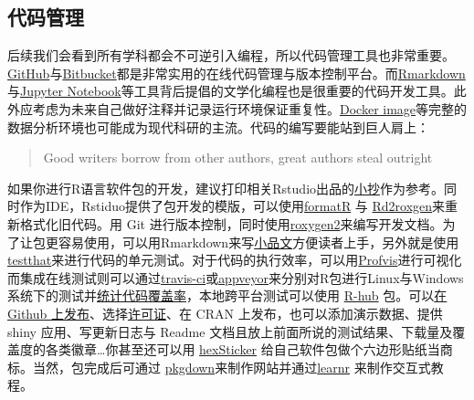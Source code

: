 \documentclass[]{tufte-book}
\begin{document}
\hypertarget{ux4ee3ux7801ux7ba1ux7406}{%
\subsection*{代码管理}\label{ux4ee3ux7801ux7ba1ux7406}}

后续我们会看到所有学科都会不可逆引入编程，所以代码管理工具也非常重要。\href{https://github.com/}{GitHub}与\href{https://bitbucket.org/}{Bitbucket}都是非常实用的在线代码管理与版本控制平台。而\href{https://rmarkdown.rstudio.com/}{Rmarkdown}与\href{https://ipython.org/notebook.html}{Jupyter Notebook}等工具背后提倡的文学化编程也是很重要的代码开发工具。此外应考虑为未来自己做好注释并记录运行环境保证重复性。\href{https://docs.docker.com/get-started/}{Docker image}等完整的数据分析环境也可能成为现代科研的主流。代码的编写要能站到巨人肩上：

\begin{quote}
Good writers borrow from other authors, great authors steal outright
\end{quote}

如果你进行R语言软件包的开发，建议打印相关Rstudio出品的\href{https://www.rstudio.com/resources/cheatsheets/}{小抄}作为参考。同时作为IDE，Rstiduo提供了包开发的模版，可以使用\href{https://yihui.name/formatr/}{formatR} 与 \href{https://cran.r-project.org/web/packages/Rd2roxygen/index.html}{Rd2roxgen}来重新格式化旧代码。用 Git 进行版本控制，同时使用\href{https://cran.r-project.org/web/packages/roxygen2/index.html}{roxygen2}来编写开发文档。为了让包更容易使用，可以用Rmarkdown来写\href{http://r-pkgs.had.co.nz/vignettes.html}{小品文}方便读者上手，另外就是使用\href{https://github.com/r-lib/testthat}{testthat}来进行代码的单元测试。对于代码的执行效率，可以用\href{https://rstudio.github.io/profvis/}{Profvis}进行可视化而集成在线测试则可以通过\href{https://travis-ci.org/}{travis-ci}或\href{https://www.appveyor.com/}{appveyor}来分别对R包进行Linux与Windows系统下的测试并\href{https://en.wikipedia.org/wiki/Code_coverage}{统计代码覆盖率}，本地跨平台测试可以使用 \href{https://cran.r-project.org/web/packages/rhub/index.html}{R-hub} 包。可以\href{https://github.com/}{在 Github 上发布}、选择\href{https://zh.wikipedia.org/wiki/\%E8\%87\%AA\%E7\%94\%B1\%E5\%8F\%8A\%E9\%96\%8B\%E6\%94\%BE\%E5\%8E\%9F\%E5\%A7\%8B\%E7\%A2\%BC\%E8\%BB\%9F\%E9\%AB\%94\%E8\%A8\%B1\%E5\%8F\%AF\%E8\%AD\%89\%E6\%AF\%94\%E8\%BC\%83}{许可证}、在 CRAN 上发布，也可以添加演示数据、提供 shiny 应用、写更新日志与 Readme 文档且放上前面所说的测试结果、下载量及覆盖度的各类徽章\ldots 你甚至还可以用 \href{https://github.com/GuangchuangYu/hexSticker}{hexSticker} 给自己软件包做个六边形贴纸当商标。当然，包完成后可通过 \href{https://github.com/r-lib/pkgdown}{pkgdown}来制作网站并通过\href{https://rstudio.github.io/learnr/}{learnr} 来制作交互式教程。
\end{document}
